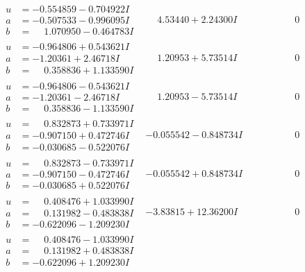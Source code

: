 \documentclass[1p]{elsarticle_modified}
\theoremstyle{definition}
\begin{document}
$$\begin{array}{c|c|c}
\begin{aligned}
u &= -0.554859 - 0.704922 I \\
a &= -0.507533 - 0.996095 I \\
b &= \phantom{-}1.070950 - 0.464783 I\end{aligned}
 & \phantom{-}4.53440 + 2.24300 I & \phantom{-0.000000 } 0 \\ \hline\begin{aligned}
u &= -0.964806 + 0.543621 I \\
a &= -1.20361 + 2.46718 I \\
b &= \phantom{-}0.358836 + 1.133590 I\end{aligned}
 & \phantom{-}1.20953 + 5.73514 I & \phantom{-0.000000 } 0 \\ \hline\begin{aligned}
u &= -0.964806 - 0.543621 I \\
a &= -1.20361 - 2.46718 I \\
b &= \phantom{-}0.358836 - 1.133590 I\end{aligned}
 & \phantom{-}1.20953 - 5.73514 I & \phantom{-0.000000 } 0 \\ \hline\begin{aligned}
u &= \phantom{-}0.832873 + 0.733971 I \\
a &= -0.907150 + 0.472746 I \\
b &= -0.030685 - 0.522076 I\end{aligned}
 & -0.055542 - 0.848734 I & \phantom{-0.000000 } 0 \\ \hline\begin{aligned}
u &= \phantom{-}0.832873 - 0.733971 I \\
a &= -0.907150 - 0.472746 I \\
b &= -0.030685 + 0.522076 I\end{aligned}
 & -0.055542 + 0.848734 I & \phantom{-0.000000 } 0 \\ \hline\begin{aligned}
u &= \phantom{-}0.408476 + 1.033990 I \\
a &= \phantom{-}0.131982 - 0.483838 I \\
b &= -0.622096 - 1.209230 I\end{aligned}
 & -3.83815 + 12.36200 I & \phantom{-0.000000 } 0 \\ \hline\begin{aligned}
u &= \phantom{-}0.408476 - 1.033990 I \\
a &= \phantom{-}0.131982 + 0.483838 I \\
b &= -0.622096 + 1.209230 I\end{aligned}

\end{array}$$
\end{document}
